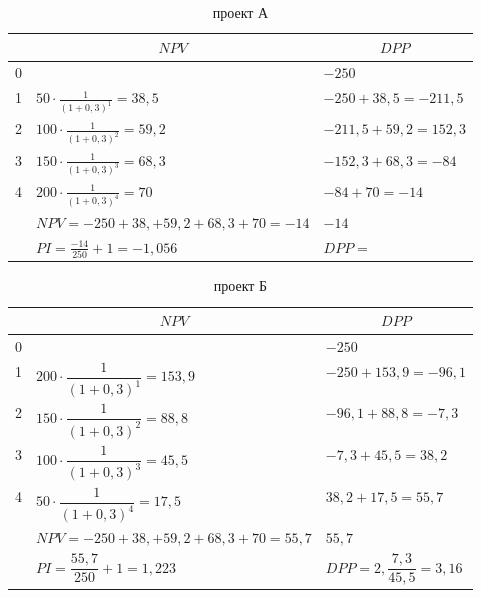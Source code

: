 
\begin{table}[!h]
	\caption{проект А}
	\small
	\setlength{\extrarowheight}{1.7mm}
		\begin{tabularx}{\textwidth}{|K{1.55cm}|p{8cm}|p{5cm}|}
		\hline
		&                       &  \\  &                                                                    &  $    -250   $                 \\  & $50 \cdot \frac{1}{(1+0,3)^1} = 38,5$  &$ -250 +38,5   = -211,5     $            \\  & $100 \cdot \frac{1}{(1+0,3)^2} = 59,2$ & $-211,5  +59,2=152,3      $           \\  & $150 \cdot \frac{1}{(1+0,3)^3} = 68,3$ &$-152,3  +68,3=-84    $             \\  & $200 \cdot \frac{1}{(1+0,3)^4} = 70$  & $-84 +70= -14     $                \\ \hline
		&$NPV = -250+38,+59,2+68,3+70=-14$     & $-14 $                     \\ \hline
		&$PI = \frac{-14}{250}+1=-1,056$                                        & $DPP = $                 \\ \hline
		\end{tabularx}
		\end{table}

\begin{table}[!h]
	\caption{проект Б}
	\small
	\setlength{\extrarowheight}{2.7mm}
	\begin{tabularx}{\textwidth}{|K{1.55cm}|p{5cm}|p{5cm}|}
		\hline
		&                       &  \\  &                                                                    &  $    -250   $                 \\  & $200 \cdot \dfrac{1}{(1+0,3)^1} = 153,9$  &$ -250 +153,9   = -96,1     $            \\  & $150 \cdot \dfrac{1}{(1+0,3)^2} = 88,8$ & $-96,1  +88,8=-7,3      $           \\  & $100 \cdot \dfrac{1}{(1+0,3)^3} = 45,5$ &$-7,3  +45,5=38,2    $             \\  & $50 \cdot \dfrac{1}{(1+0,3)^4} =17,5$  & $38,2 +17,5= 55,7     $                \\ \hline
		&$NPV = -250+38,+59,2+68,3+70=55,7$     & $55,7 $                     \\ \hline
		&$PI = \dfrac{55,7}{250}+1=1,223$                                        & $DPP = 2,\dfrac{7,3}{45,5}=3,16$                 \\ \hline
	\end{tabularx}
\end{table}

